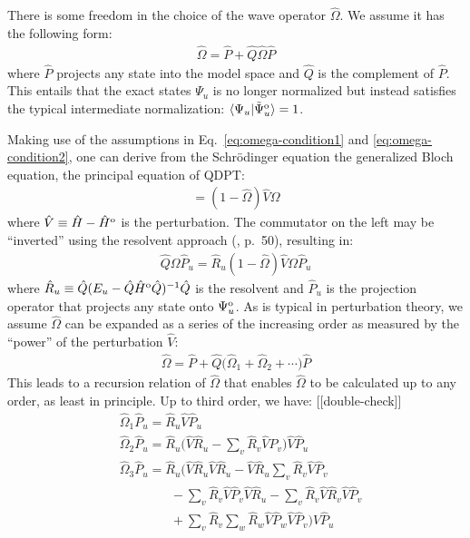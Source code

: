 \documentclass[amsmath, amssymb, aps, floatfix, nofootinbib, preprintnumbers,showpacs, superscriptaddress, twocolumn]{revtex4-1}
\begin{document}
There is some freedom in the choice of the wave operator $\hat \Omega$.  We
assume it has the following form:
\begin{align} \label{eq:omega-condition2}
  \hat \Omega = \hat P + \hat Q \hat \Omega \hat P
\end{align}
where $\hat P$ projects any state into the model space and $\hat Q$ is the
complement of $\hat P$.  This entails that the exact states $\Psi_u$ is no
longer normalized but instead satisfies the typical intermediate
normalization: $\langle \Psi_u | \tilde \Psi^{\text o}_u \rangle = 1$.

Making use of the assumptions in Eq.\ \eqref{eq:omega-condition1} and \eqref{eq:omega-condition2}, one can derive from the Schr\"odinger equation the generalized Bloch equation, the principal equation of QDPT:
\begin{gather*}
  [\hat \Omega, \hat H^{\text o}] =
  (1 - \hat \Omega) \hat V \Omega
\end{gather*}
where $\hat V \equiv \hat H - \hat H^{\text o}$ is the perturbation.  The
commutator on the left may be ``inverted'' using the resolvent approach
(\cite{shavitt2009many}, p.\ 50), resulting in:
\begin{align*}
  \hat Q \Omega \hat P_u =
  \hat R_u (1 - \hat \Omega) \hat V \Omega \hat P_u
\end{align*}
where $\hat R_u \equiv \hat Q (E_u - \hat Q \hat H^{\text o} \hat Q)^{-1} \hat Q$ is the resolvent and $\hat P_u$ is the projection operator that projects any state onto $\Psi^{\text o}_u$.  As is typical in perturbation theory, we assume $\hat \Omega$ can be expanded as a series of the increasing order as measured by the ``power'' of the perturbation $\hat V$:
\begin{align*}
  \hat \Omega = \hat P +
  \hat Q\bigl(\hat \Omega_1 + \hat \Omega_2 + \cdots\bigr) \hat P
\end{align*}
This leads to a recursion relation of $\hat \Omega$ that enables $\hat \Omega$ to be calculated up to any order, as least in principle.  Up to third order, we have: [[double-check]]
\begin{align*}
  &\hat \Omega_1 \hat P_u = \hat R_u \hat V \hat P_u \\
  &\hat \Omega_2 \hat P_u =
    \hat R_u \biggl(
    \hat V \hat R_u
    - \sum_v \hat R_v \hat V \hat P_v
    \biggr) \hat V \hat P_u \\
  &\hat \Omega_3 \hat P_u =
    \hat R_u \biggl(
    \hat V \hat R_u \hat V \hat R_u
    - \hat V \hat R_u \sum_v \hat R_v \hat V \hat P_v \\
  &\qquad\qquad
    - \sum_v \hat R_v \hat V \hat P_v \hat V \hat R_u
    - \sum_v \hat R_v \hat V \hat R_v \hat V \hat P_v \\
  &\qquad\qquad
    + \sum_v \hat R_v \sum_w \hat R_w \hat V \hat P_w \hat V \hat P_v
    \biggr) \hat V \hat P_u
\end{align*}
\end{document}

